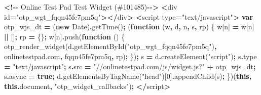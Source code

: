 \documentclass[
]{book}
\newenvironment{Shaded}{\begin{snugshade}}{\end{snugshade}}
\newcommand{\AttributeTok}[1]{\textcolor[rgb]{0.77,0.63,0.00}{#1}}
\newcommand{\BuiltInTok}[1]{#1}
\newcommand{\DecValTok}[1]{\textcolor[rgb]{0.00,0.00,0.81}{#1}}
\newcommand{\FunctionTok}[1]{\textcolor[rgb]{0.00,0.00,0.00}{#1}}
\newcommand{\KeywordTok}[1]{\textcolor[rgb]{0.13,0.29,0.53}{\textbf{#1}}}
\newcommand{\NormalTok}[1]{#1}
\newcommand{\OperatorTok}[1]{\textcolor[rgb]{0.81,0.36,0.00}{\textbf{#1}}}
\newcommand{\StringTok}[1]{\textcolor[rgb]{0.31,0.60,0.02}{#1}}
\begin{document}
\begin{Shaded}
\begin{Highlighting}[]
\OperatorTok{\textless{}!{-}{-}}\NormalTok{ Online Test Pad Test }\FunctionTok{Widget}\NormalTok{ (\#}\DecValTok{101485}\NormalTok{)}\OperatorTok{{-}{-}\textgreater{}}
\OperatorTok{\textless{}}\NormalTok{div id}\OperatorTok{=}\StringTok{"otp\_wgt\_fqqn45fe7pm5q"}\OperatorTok{\textgreater{}\textless{}/}\NormalTok{div}\OperatorTok{\textgreater{}}
\OperatorTok{\textless{}}\NormalTok{script type}\OperatorTok{=}\StringTok{"text/javascript"}\OperatorTok{\textgreater{}}
    \KeywordTok{var}\NormalTok{ otp\_wjs\_dt }\OperatorTok{=}\NormalTok{ (}\KeywordTok{new} \BuiltInTok{Date}\NormalTok{)}\OperatorTok{.}\FunctionTok{getTime}\NormalTok{()}\OperatorTok{;}
\NormalTok{    (}\KeywordTok{function}\NormalTok{ (w}\OperatorTok{,}\NormalTok{ d}\OperatorTok{,}\NormalTok{ n}\OperatorTok{,}\NormalTok{ s}\OperatorTok{,}\NormalTok{ rp) \{}
\NormalTok{        w[n] }\OperatorTok{=}\NormalTok{ w[n] }\OperatorTok{||}\NormalTok{ []}\OperatorTok{;}
\NormalTok{        rp }\OperatorTok{=}\NormalTok{ \{\}}\OperatorTok{;}
\NormalTok{        w[n]}\OperatorTok{.}\FunctionTok{push}\NormalTok{(}\KeywordTok{function}\NormalTok{ () \{}
            \FunctionTok{otp\_render\_widget}\NormalTok{(d}\OperatorTok{.}\FunctionTok{getElementById}\NormalTok{(}\StringTok{"otp\_wgt\_fqqn45fe7pm5q"}\NormalTok{)}\OperatorTok{,} \StringTok{\textquotesingle{}onlinetestpad.com\textquotesingle{}}\OperatorTok{,} \StringTok{\textquotesingle{}fqqn45fe7pm5q\textquotesingle{}}\OperatorTok{,}\NormalTok{ rp)}\OperatorTok{;}
\NormalTok{        \})}\OperatorTok{;} 
\NormalTok{        s }\OperatorTok{=}\NormalTok{ d}\OperatorTok{.}\FunctionTok{createElement}\NormalTok{(}\StringTok{"script"}\NormalTok{)}\OperatorTok{;}
\NormalTok{        s}\OperatorTok{.}\AttributeTok{type} \OperatorTok{=} \StringTok{"text/javascript"}\OperatorTok{;}
\NormalTok{        s}\OperatorTok{.}\AttributeTok{src} \OperatorTok{=} \StringTok{"//onlinetestpad.com/js/widget.js?"} \OperatorTok{+}\NormalTok{ otp\_wjs\_dt}\OperatorTok{;}
\NormalTok{        s}\OperatorTok{.}\AttributeTok{async} \OperatorTok{=} \KeywordTok{true}\OperatorTok{;}
\NormalTok{        d}\OperatorTok{.}\FunctionTok{getElementsByTagName}\NormalTok{(}\StringTok{"head"}\NormalTok{)[}\DecValTok{0}\NormalTok{]}\OperatorTok{.}\FunctionTok{appendChild}\NormalTok{(s)}\OperatorTok{;}
\NormalTok{    \})(}\KeywordTok{this}\OperatorTok{,} \KeywordTok{this}\OperatorTok{.}\AttributeTok{document}\OperatorTok{,} \StringTok{"otp\_widget\_callbacks"}\NormalTok{)}\OperatorTok{;}
\OperatorTok{\textless{}/}\NormalTok{script}\OperatorTok{\textgreater{}}
\end{Highlighting}
\end{Shaded}


  
\end{document}
